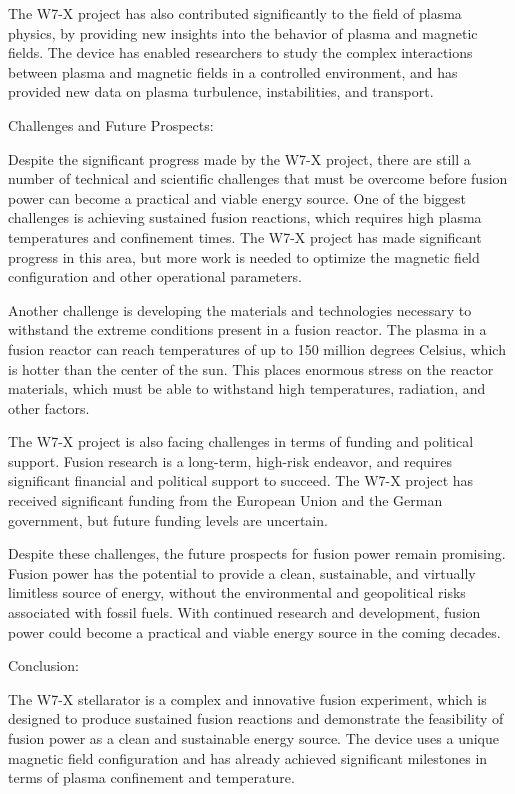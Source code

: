 \documentclass[12pt]{article}
\begin{document}
The W7-X project has also contributed significantly to the field of plasma physics, by providing new insights into the behavior of plasma and magnetic fields. The device has enabled researchers to study the complex interactions between plasma and magnetic fields in a controlled environment, and has provided new data on plasma turbulence, instabilities, and transport.

Challenges and Future Prospects:

Despite the significant progress made by the W7-X project, there are still a number of technical and scientific challenges that must be overcome before fusion power can become a practical and viable energy source. One of the biggest challenges is achieving sustained fusion reactions, which requires high plasma temperatures and confinement times. The W7-X project has made significant progress in this area, but more work is needed to optimize the magnetic field configuration and other operational parameters.

Another challenge is developing the materials and technologies necessary to withstand the extreme conditions present in a fusion reactor. The plasma in a fusion reactor can reach temperatures of up to 150 million degrees Celsius, which is hotter than the center of the sun. This places enormous stress on the reactor materials, which must be able to withstand high temperatures, radiation, and other factors.

The W7-X project is also facing challenges in terms of funding and political support. Fusion research is a long-term, high-risk endeavor, and requires significant financial and political support to succeed. The W7-X project has received significant funding from the European Union and the German government, but future funding levels are uncertain.

Despite these challenges, the future prospects for fusion power remain promising. Fusion power has the potential to provide a clean, sustainable, and virtually limitless source of energy, without the environmental and geopolitical risks associated with fossil fuels. With continued research and development, fusion power could become a practical and viable energy source in the coming decades.

Conclusion:

The W7-X stellarator is a complex and innovative fusion experiment, which is designed to produce sustained fusion reactions and demonstrate the feasibility of fusion power as a clean and sustainable energy source. The device uses a unique magnetic field configuration and has already achieved significant milestones in terms of plasma confinement and temperature.
\end{document}

